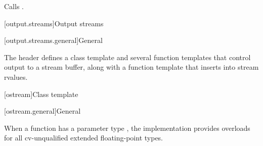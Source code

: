 \begin{itemdescr}
\pnum
\effects
Calls .
\end{itemdescr}


[output.streams]{Output streams}

[output.streams.general]{General}

\pnum
The header  defines a class template
and several function templates that control output to a stream buffer,
along with a function template that inserts into stream rvalues.

[ostream]{Class template }

[ostream.general]{General}

\pnum
When a function has
a parameter type ,
the implementation provides overloads
for all cv-unqualified extended floating-point types.

